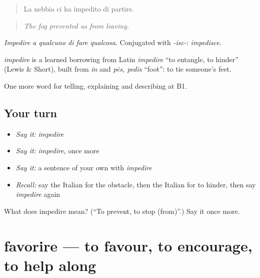 \begin{quote}
La nebbia ci ha impedito di partire.
\end{quote}

\begin{quote}
\emph{The fog prevented us from leaving.}
\end{quote}

\emph{Impedire a qualcuno di fare qualcosa}. Conjugated with \emph{-isc-}: \emph{impedisce}.

\begin{cousinweb}
\emph{impedire} is a learned borrowing from Latin \emph{impedīre} \textquotedblleft{}to entangle, to hinder\textquotedblright{} (Lewis \& Short), built from \emph{in} and \emph{pēs, pedis} \textquotedblleft{}foot\textquotedblright{}: to tie someone's feet.
\end{cousinweb}

\begin{grammarlens}[title={What you've built}]
One more word for telling, explaining and describing at B1.
\end{grammarlens}

\subsection*{Your turn}
\begin{itemize}
\raggedright
  \item \emph{Say it:} \emph{impedire}
  \item \emph{Say it:} \emph{impedire}, once more
  \item \emph{Say it:} a sentence of your own with \emph{impedire}
  \item \emph{Recall:} say the Italian for the obstacle, then the Italian for to hinder, then say \emph{impedire} again
\end{itemize}

\begin{tcolorbox}[breakable,colback=teal!4,colframe=teal!35!black,title={Before you move on}]
What does impedire mean? (\textquotedblleft{}To prevent, to stop (from)\textquotedblright{}.) Say it once more.
\end{tcolorbox}
\section[favorire]{favorire — to favour, to encourage, to help along}

\label{lesson:IT-C354-favorire}



